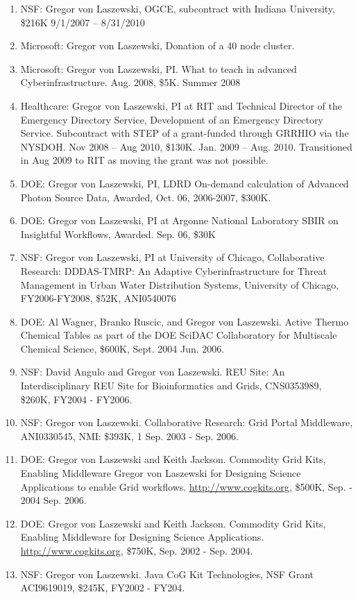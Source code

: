 \documentclass{article}
\begin{document}
\begin{enumerate}
\item  NSF: Gregor von Laszewski, OGCE, subcontract with Indiana University, \$216K 9/1/2007 – 8/31/2010
\item  Microsoft: Gregor von Laszewski, Donation of a 40 node cluster. 
\item  Microsoft: Gregor von Laszewski, PI. What to teach in advanced Cyberinfrastructure. Aug. 2008, \$5K. Summer 2008
\item  Healthcare: Gregor von Laszewski, PI at RIT and Technical Director of the Emergency Directory Service, Development of an Emergency Directory Service. Subcontract with STEP of a grant-funded through GRRHIO via the NYSDOH. Nov 2008 – Aug 2010, \$130K. Jan. 2009 – Aug. 2010. Transitioned in Aug 2009 to RIT as moving the grant was not possible.
\item  DOE: Gregor von Laszewski, PI, LDRD On-demand calculation of Advanced Photon Source Data, Awarded, Oct. 06, 2006-2007, \$300K. 
\item  DOE: Gregor von Laszewski, PI at Argonne National Laboratory SBIR on Insightful Workflows, Awarded. Sep. 06, \$30K 
\item  NSF: Gregor von Laszewski, PI at University of Chicago, Collaborative Research: DDDAS-TMRP: An Adaptive Cyberinfrastructure for Threat Management in Urban Water Distribution Systems, University of Chicago, FY2006-FY2008, \$52K, ANI0540076 
\item  DOE: Al Wagner, Branko Ruscic, and Gregor von Laszewski. Active Thermo Chemical Tables as part of the DOE SciDAC Collaboratory for Multiscale Chemical Science, \$600K, Sept. 2004 Jun. 2006. 
\item  NSF: David Angulo and Gregor von Laszewski. REU Site: An Interdisciplinary REU Site for Bioinformatics and Grids, CNS0353989, \$260K, FY2004 - FY2006. 
\item  NSF: Gregor von Laszewski. Collaborative Research: Grid Portal Middleware, ANI0330545, NMI: \$393K, 1 Sep. 2003 - Sep. 2006. 
\item  DOE: Gregor von Laszewski and Keith Jackson. Commodity Grid Kits, Enabling Middleware Gregor von Laszewski for Designing Science Applications to enable Grid workflows. \url{http://www.cogkits.org}, \$500K, Sep. - 2004 Sep. 2006. 
\item  DOE: Gregor von Laszewski and Keith Jackson. Commodity Grid Kits, Enabling Middleware for Designing Science Applications. \url{http://www.cogkits.org}, \$750K, Sep. 2002 - Sep. 2004. 
\item  NSF: Gregor von Laszewski. Java CoG Kit Technologies, NSF Grant ACI9619019, \$245K, FY2002 - FY204. 

\end{enumerate}
\end{document}
